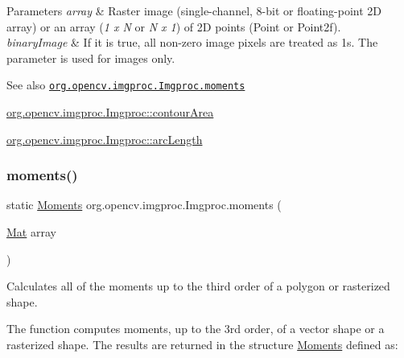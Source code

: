 \begin{DoxyParams}{Parameters}
{\em array} & Raster image (single-\/channel, 8-\/bit or floating-\/point 2D array) or an array ({\itshape 1 x N} or {\itshape N x 1}) of 2D points ({\ttfamily Point} or {\ttfamily Point2f}). \\
\hline
{\em binary\+Image} & If it is true, all non-\/zero image pixels are treated as 1\textquotesingle{}s. The parameter is used for images only.\\
\hline
\end{DoxyParams}
\begin{DoxySeeAlso}{See also}
\href{http://docs.opencv.org/modules/imgproc/doc/structural_analysis_and_shape_descriptors.html#moments}{\tt org.\+opencv.\+imgproc.\+Imgproc.\+moments} 

\mbox{\hyperlink{classorg_1_1opencv_1_1imgproc_1_1_imgproc_a0b9b82e8b2461a102788628c8b86d1a1}{org.\+opencv.\+imgproc.\+Imgproc\+::contour\+Area}} 

\mbox{\hyperlink{classorg_1_1opencv_1_1imgproc_1_1_imgproc_a7e92ef5f2b2d486e256ee5e813de19c6}{org.\+opencv.\+imgproc.\+Imgproc\+::arc\+Length}} 
\end{DoxySeeAlso}
\mbox{\label{classorg_1_1opencv_1_1imgproc_1_1_imgproc_a7c002c128b749bd96ce843ae73165e6e}} 
\subsubsection{\texorpdfstring{moments()}{moments()}\hspace{0.1cm}{\footnotesize\ttfamily [2/2]}}
{\footnotesize\ttfamily static \mbox{\hyperlink{classorg_1_1opencv_1_1imgproc_1_1_moments}{Moments}} org.\+opencv.\+imgproc.\+Imgproc.\+moments (\begin{DoxyParamCaption}\item[{\mbox{\hyperlink{classorg_1_1opencv_1_1core_1_1_mat}{Mat}}}]{array }\end{DoxyParamCaption})\hspace{0.3cm}{\ttfamily [static]}}

Calculates all of the moments up to the third order of a polygon or rasterized shape.

The function computes moments, up to the 3rd order, of a vector shape or a rasterized shape. The results are returned in the structure {\ttfamily \mbox{\hyperlink{classorg_1_1opencv_1_1imgproc_1_1_moments}{Moments}}} defined as\+: {\ttfamily }

